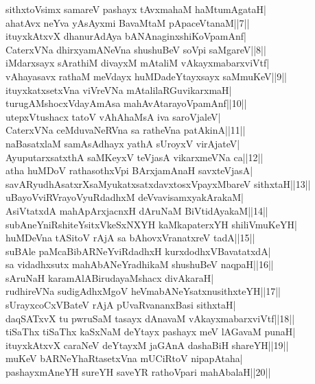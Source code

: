 \documentclass{article}
\begin{document}
sithxtoVsimx samareV pashayx tAvxmahaM haMtumAgataH|\\
ahatAvx neYva yAsAyxmi BavaMtaM pApaceVtanaM||7||\\
ituyxkAtxvX dhanurAdAya bANAnaginxshiKoVpamAnf|\\
CaterxVNa dhirxyamANeVna shushuBeV soVpi saMgareV||8||\\
iMdarxsayx sArathiM divayxM mAtaliM vAkayxmabarxviVtf|\\
vAhayasavx rathaM meVdayx huMDadeYtayxsayx saMmuKeV||9||\\
ituyxkatxsetxVna viVreVNa mAtalilaRGuvikarxmaH|\\
turugAMshocxVdayAmAsa mahAvAtarayoVpamAnf||10||\\
utepxVtushacx tatoV vAhAhaMsA iva saroVjaleV|\\
CaterxVNa ceMduvaNeRVna sa ratheVna patAkinA||11||\\
naBasatxlaM samAsAdhayx yathA sUroyxV virAjateV|\\
AyuputarxsatxthA saMKeyxV teVjasA vikarxmeVNa ca||12||\\
atha huMDoV rathasothxVpi BArxjamAnaH savxteVjasA|\\
savARyudhAsatxrXsaMyukatxsatxdavxtosxVpayxMbareV sithxtaH||13||\\
uBayoVviRVrayoVyuRdadhxM deVvavisamxyakArakaM|\\
AsiVtatxdA mahApArxjacnxH dAruNaM BiVtidAyakaM||14||\\
subAneYniRshiteYsitxVkeSxNXYH kaMkapaterxYH shiliVmuKeYH|\\
huMDeVna tASitoV rAjA sa bAhovxVranatxreV tadA||15||\\
suBAle paMcaBibARNeYviRdadhxH kurxdodhxVBavatatxdA|\\
sa vidadhxsutx mahAbANeYradhikaM shushuBeV naqpaH||16||\\
sAruNaH karamAlABirudayaMshacx divAkaraH|\\
rudhireVNa sudigAdhxMgoV heVmabANeYsatxnusithxteYH||17||\\
sUrayxcoCxVBateV rAjA pUvaRvananxBasi sithxtaH|\\
daqSATxvX tu pwruSaM tasayx dAnavaM vAkayxmabarxviVtf||18||\\
tiSaThx tiSaThx kaSxNaM deYtayx pashayx meV lAGavaM punaH|\\
ituyxkAtxvX caraNeV deYtayxM jaGAnA dashaBiH shareYH||19||\\
muKeV bARNeYhaRtasetxVna mUCiRtoV nipapAtaha|\\
pashayxmAneYH sureYH saveYR rathoVpari mahAbalaH||20||\\
\end{document}
